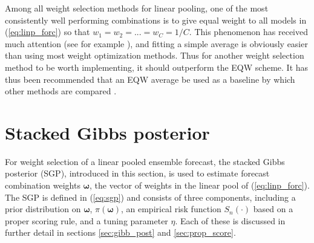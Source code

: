 Among all weight selection methods for linear pooling, one of the most 
consistently well performing combinations is to give equal weight to all 
models in (\ref{eq:linp_forc}) so that $w_1 = w_2 = ... = w_C = 1/C$. This 
phenomenon has received much attention (see for example 
\cite{frazier2023solving,claeskens2016forecast,smith2009simple}), 
and fitting a simple average is obviously easier than using most weight 
optimization methods. Thus for another weight selection method to be worth 
implementing, it should outperform the EQW scheme. It has thus been recommended 
that an EQW average be used as a baseline by which other methods 
are compared 
\cite[]{li2023bayesian,clemen1989combining}.





\section{Stacked Gibbs posterior} \label{sec:sgp}

For weight selection of a linear pooled ensemble forecast, the stacked Gibbs 
posterior (SGP), introduced in this section, is used to estimate forecast 
combination weights $\boldsymbol{\omega}$, 
the vector of weights in the linear pool of 
(\ref{eq:linp_forc}). The SGP is defined in (\ref{eq:sgp}) and consists of 
three  components, including a prior distribution on $\boldsymbol{\omega}$, 
$\pi(\boldsymbol{\omega})$, 
an empirical risk function $S_n(\cdot)$ based on a proper scoring rule, and a 
tuning parameter $\eta$. Each of these is discussed in further detail in 
sections \ref{sec:gibb_post} and \ref{sec:prop_score}.

